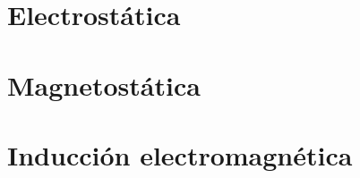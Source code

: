 \documentclass[12pt,a4paper]{book}
\begin{document}
\chapter{Electrostática}

\chapter{Magnetostática}

\chapter{Inducción electromagnética}






\newpage{\pagestyle{empty}\cleardoublepage}




%

\end{document}
